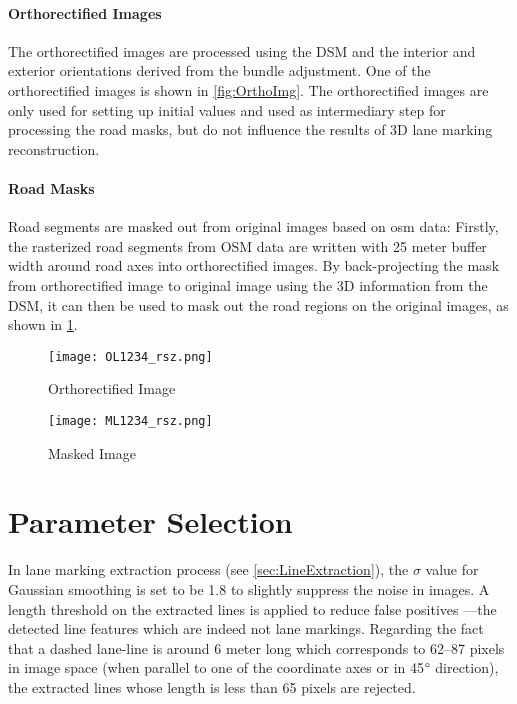 \paragraph{Orthorectified Images}
The orthorectified images are processed using the DSM and the interior and exterior orientations derived from the bundle adjustment. One of the orthorectified images is shown in \cref{fig:OrthoImg}. The orthorectified images are only used for setting up initial values and used as intermediary step for processing the road masks, but do not influence the results of 3D lane marking reconstruction.

\paragraph{Road Masks}
Road segments are masked out from original images based on \gls{osm} data: Firstly, the rasterized road segments from OSM data are written with 25 meter buffer width around road axes into orthorectified images. By back-projecting the mask from orthorectified image to original image using the 3D information from the DSM, it can then be used to mask out the road regions on the original images, as shown in \cref{fig:MaskedImg}.

\begin{figure}%
	\centering
    	\texttt{[image: OL1234\_rsz.png]}
    	\caption{\small Orthorectified Image}
    	\label{fig:OrthoImg}
	\vspace{0.5cm}
		\texttt{[image: ML1234\_rsz.png]}
		\caption{\small Masked Image}
		\label{fig:MaskedImg}
\end{figure}

\clearpage
\section{Parameter Selection}
\label{sec:ParameterSelection}

In lane marking extraction process (see \cref{sec:LineExtraction}), the $\sigma$ value for Gaussian smoothing is set to be 1.8 to slightly suppress the noise in images. %
A length threshold on the extracted lines is applied to reduce false positives ---the detected line features which are indeed not lane markings. Regarding the fact that a dashed lane-line is around 6 meter long which corresponds to 62--87 pixels in image space (when parallel to one of the coordinate axes or in 45$\degree$ direction), the extracted lines whose length is less than 65 pixels are rejected.



